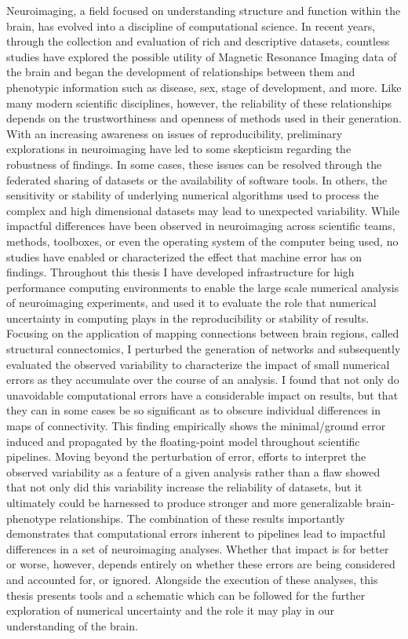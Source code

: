 Neuroimaging, a field focused on understanding structure and function within the brain, has evolved into a
discipline of computational science. In recent years, through the collection and evaluation of rich and
descriptive datasets, countless studies have explored the possible utility of Magnetic Resonance Imaging data
of the brain and began the development of relationships between them and phenotypic information such as
disease, sex, stage of development, and more. Like many modern scientific disciplines, however, the
reliability of these relationships depends on the trustworthiness and openness of methods used in their
generation. With an increasing awareness on issues of reproducibility, preliminary explorations in
neuroimaging have led to some skepticism regarding the robustness of findings. In some cases, these issues
can be resolved through the federated sharing of datasets or the availability of software tools. In others,
the sensitivity or stability of underlying numerical algorithms used to process the complex and high
dimensional datasets may lead to unexpected variability. While impactful differences have been observed in
neuroimaging across scientific teams, methods, toolboxes, or even the operating system of the computer being
used, no studies have enabled or characterized the effect that machine error has on findings. Throughout
this thesis I have developed infrastructure for high performance computing environments to enable the large
scale numerical analysis of neuroimaging experiments, and used it to evaluate the role that numerical
uncertainty in computing plays in the reproducibility or stability of results. Focusing on the application of
mapping connections between brain regions, called structural connectomics, I perturbed the generation of
networks and subsequently evaluated the observed variability to characterize the impact of small numerical
errors as they accumulate over the course of an analysis. I found that not only do unavoidable computational
errors have a considerable impact on results, but that they can in some cases be so significant as to obscure
individual differences in maps of connectivity. This finding empirically shows the minimal/ground error
induced and propagated by the floating-point model throughout scientific pipelines. Moving beyond the
perturbation of error, efforts to interpret the observed variability as a feature of a given analysis rather
than a flaw showed that not only did this variability increase the reliability of datasets, but it ultimately
could be harnessed to produce stronger and more generalizable brain-phenotype relationships. The combination
of these results importantly demonstrates that computational errors inherent to pipelines lead to impactful
differences in a set of neuroimaging analyses. Whether that impact is for better or worse, however, depends
entirely on whether these errors are being considered and accounted for, or ignored. Alongside the execution
of these analyses, this thesis presents tools and a schematic which can be followed for the further
exploration of numerical uncertainty and the role it may play in our understanding of the brain.

